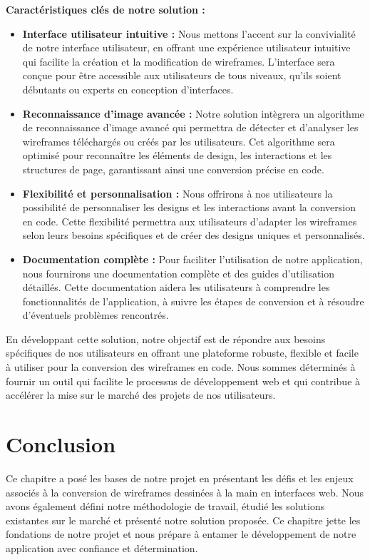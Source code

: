 \textbf{Caractéristiques clés de notre solution :}
\begin{itemize}
    \item \textbf{Interface utilisateur intuitive :} Nous mettons l'accent sur la convivialité de notre interface utilisateur, en offrant une expérience utilisateur intuitive qui facilite la création et la modification de wireframes. L'interface sera conçue pour être accessible aux utilisateurs de tous niveaux, qu'ils soient débutants ou experts en conception d'interfaces.

    \item \textbf{Reconnaissance d'image avancée :} Notre solution intègrera un algorithme de reconnaissance d'image avancé qui permettra de détecter et d'analyser les wireframes téléchargés ou créés par les utilisateurs. Cet algorithme sera optimisé pour reconnaître les éléments de design, les interactions et les structures de page, garantissant ainsi une conversion précise en code.

    \item \textbf{Flexibilité et personnalisation :} Nous offrirons à nos utilisateurs la possibilité de personnaliser les designs et les interactions avant la conversion en code. Cette flexibilité permettra aux utilisateurs d'adapter les wireframes selon leurs besoins spécifiques et de créer des designs uniques et personnalisés.

    \item \textbf{Documentation complète :} Pour faciliter l'utilisation de notre application, nous fournirons une documentation complète et des guides d'utilisation détaillés. Cette documentation aidera les utilisateurs à comprendre les fonctionnalités de l'application, à suivre les étapes de conversion et à résoudre d'éventuels problèmes rencontrés.
\end{itemize}

En développant cette solution, notre objectif est de répondre aux besoins spécifiques de nos utilisateurs en offrant une plateforme robuste, flexible et facile à utiliser pour la conversion des wireframes en code. Nous sommes déterminés à fournir un outil qui facilite le processus de développement web et qui contribue à accélérer la mise sur le marché des projets de nos utilisateurs.

\section{Conclusion}

Ce chapitre a posé les bases de notre projet en présentant les défis et les enjeux associés à la conversion de wireframes dessinées à la main en interfaces web. Nous avons également défini notre méthodologie de travail, étudié les solutions existantes sur le marché et présenté notre solution proposée. Ce chapitre jette les fondations de notre projet et nous prépare à entamer le développement de notre application avec confiance et détermination.

